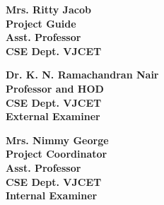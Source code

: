 \documentclass[a4 paper,11pt]{report}
\begin{document}
\begin{minipage}{.6\textwidth}
	\vspace{1cm}
	\begin{flushright} 
		\begin{flushleft}
			\hspace{2cm}			
			\textbf{Mrs. Ritty Jacob}\\
			\hspace{2cm}
			\textbf{Project Guide}\\
			\hspace{2cm}
			\textbf{Asst. Professor}\\
			\hspace{2cm}
			\textbf{CSE Dept. VJCET}\\
		\end{flushleft}
	\end{flushright}
\end{minipage}
\begin{minipage}{.6\textwidth}
	\vspace{1cm}
	\begin{flushleft} 
		\textbf{Dr. K. N. Ramachandran Nair}\\
		\textbf{Professor and HOD}\\
		\textbf{CSE Dept. VJCET}\\
		\vspace{1.7cm}
		\textbf{External Examiner}\\
		\vspace{1cm}
		\underline{\hspace{4cm}}
	\end{flushleft}
\end{minipage}
\begin{minipage}{.6\textwidth}
	\vspace{1cm}
	\begin{flushright} 
		\begin{flushleft}
			\hspace{2cm}
			\textbf{Mrs. Nimmy George}\\
			\hspace{2cm}
			\textbf{Project Coordinator}\\
			\hspace{2cm}
			\textbf{Asst. Professor}\\
			\hspace{2cm}
			\textbf{CSE Dept. VJCET}\\
			\vspace{0.9cm}
			\hspace{2cm}
			\textbf{Internal Examiner}\\
			\vspace{1cm}
			\hspace{2cm}
			\underline{\hspace{4cm}}
		\end{flushleft}
	\end{flushright}
\end{minipage}
\end{document}
